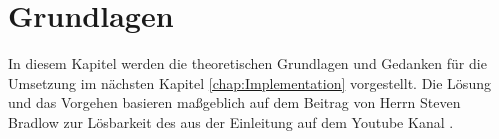 \chapter{Grundlagen}
In diesem Kapitel werden die theoretischen Grundlagen und Gedanken für die Umsetzung im nächsten Kapitel \ref{chap:Implementation} vorgestellt. Die Lösung und das Vorgehen basieren maßgeblich auf dem Beitrag  von Herrn Steven Bradlow zur Lösbarkeit des  aus der Einleitung auf dem Youtube Kanal  \autocite{Unsolvable-14-15-Numberphile-YT:online}.%
%





